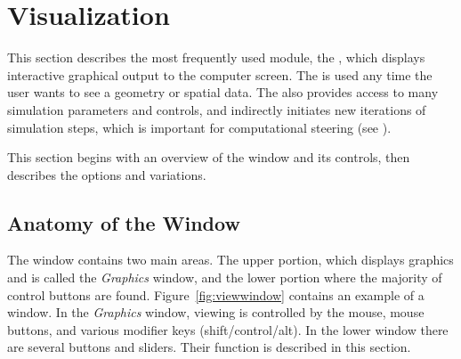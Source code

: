   \newcommand{\boxwidget}%
  {\centerline{\epsfig{file=Figures/widget-box.eps.gz,height=2in,
  bbllx=0, bblly=0, bburx=458, bbury=342}}}
\begin{htmlonly}
  \newcommand{\boxwidget}{%
  \htmladdimg[align=top,width=459,alt="boxwidget"]
  {../Figures/widget-box.gif}}
\end{htmlonly}

  \newcommand{\ringwidget}%
  {\centerline{\epsfig{file=Figures/widget-ring.eps.gz,height=2in,
  bbllx=0, bblly=0, bburx=507, bbury=467}}}
\begin{htmlonly}
  \newcommand{\ringwidget}{%
  \htmladdimg[align=top,width=508,alt="ringwidget"]
  {../Figures/widget-ring.gif}}
\end{htmlonly}

\newcommand{\graphics}{\emph{Graphics}}

\chapter{Visualization}
\label{ch:viewer}

This section describes the most frequently used \sr{} module,
the \viewer{}, which displays interactive graphical
output to the computer screen.  The \viewer{} is used any time the user
wants to see a geometry or spatial data. The \viewer{} also provides access to
many simulation parameters and controls, and indirectly initiates new
iterations of  simulation steps, which is important for computational steering (see ).

This section begins with an overview of the \viewer{} window and its
controls, then describes the options and variations.

\section{Anatomy of the \viewer{} Window}
\label{sec:viewer-anatomy} 

The \viewer{} window contains two main areas.  The upper portion,
which displays graphics and is called the \graphics{} window, and the
lower portion where the majority of control buttons are found.
Figure~\ref{fig:viewwindow} contains an example of a \viewer{} window.
In the \graphics{} window, viewing is controlled by the mouse, mouse
buttons, and various modifier keys (shift/control/alt).  In the lower
window there are several buttons and sliders. Their function is
described in this section.

